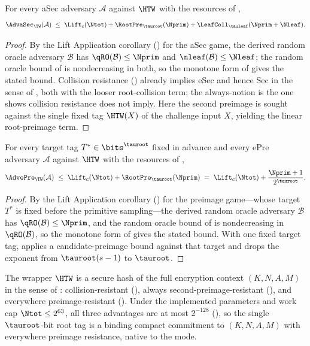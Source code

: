 \begin{theorem}
\label{thm:asec}
For every aSec adversary $\mathcal{A}$ against $\HTW$ with the resources
of ,
\[
  \AdvaSec_\TW(\mathcal{A})
  \;\leq\;
  \Lift_c(\Ntot)
  + \RootPre_{\tauroot}(\Nprim)
  + \LeafColl_{\tauleaf}(\Nprim+\Nleaf).
\]
\end{theorem}

\begin{proof}
By the Lift Application corollary () for the
aSec game, the derived random oracle adversary $\mathcal{B}$ has
$\qRO(\mathcal{B}) \leq \Nprim$ and $\nleaf(\mathcal{B}) \leq \Nleaf$; the
random oracle bound of  is nondecreasing in both, so the
monotone form of  gives the stated bound.
Collision resistance () already implies eSec and hence Sec
in the sense of \cite{RS04}, both with the looser root-collision term; the
always-notion is the one \cite{RS04} shows collision resistance does not
imply. Here the second preimage is sought against the single fixed tag
$\HTW(X)$ of the challenge input $X$, yielding the linear root-preimage
term.
\end{proof}

\begin{theorem}
\label{thm:epre}
For every target tag $T^* \in \bits^{\tauroot}$ fixed in advance and every
ePre adversary $\mathcal{A}$ against $\HTW$ with the resources of
,
\[
  \AdvePre_\TW(\mathcal{A})
  \;\leq\;
  \Lift_c(\Ntot) + \RootPre_{\tauroot}(\Nprim)
  \;=\;
  \Lift_c(\Ntot) + \frac{\Nprim + 1}{2^{\tauroot}}.
\]
\end{theorem}

\begin{proof}
By the Lift Application corollary () for the
preimage game---whose target $T^*$ is fixed before the primitive
sampling---the derived random oracle adversary $\mathcal{B}$ has
$\qRO(\mathcal{B}) \leq \Nprim$, and the random oracle bound of
 is nondecreasing in $\qRO(\mathcal{B})$, so the monotone
form of  gives the stated bound. With one fixed
target tag,  applies a candidate-preimage bound against
that target and drops the exponent from $\tauroot(s-1)$ to $\tauroot$.
\end{proof}

\begin{corollary}
\label{cor:tag-commitment}
The wrapper $\HTW$ is a secure hash of the full encryption context
$(K, N, A, M)$ in the sense of \cite{RS04}: collision-resistant
(), always second-preimage-resistant (), and
everywhere preimage-resistant (). Under the implemented
parameters and work cap $\Ntot \leq 2^{63}$, all three advantages are at most
$2^{-128}$ (), so the single $\tauroot$-bit
root tag is a binding compact commitment to $(K, N, A, M)$ with everywhere
preimage resistance, native to the mode.
\end{corollary}

